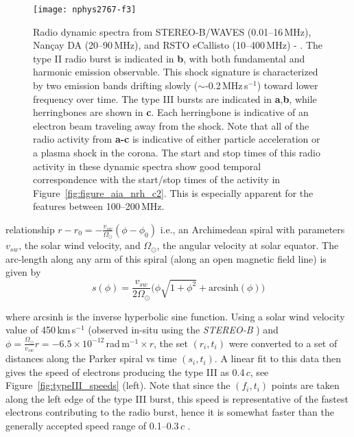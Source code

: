 \begin{sidewaysfigure}[!t]
    \centering
		\texttt{[image: nphys2767-f3]}
\caption[Radio dynamic spectra of 22-September-2011 event]{Radio dynamic spectra from STEREO-B/WAVES (0.01--16\,MHz), Nan\c{c}ay DA (20--90\,MHz), and RSTO eCallisto (10--400\,MHz) - \citep{carley2013}. The type II radio burst is indicated in {\bf b}, with both fundamental and harmonic emission observable. This shock signature is characterized by two emission bands drifting slowly ($\sim$-0.2\,MHz\,s$^{-1}$) toward lower frequency over time. The type III bursts are indicated in {\bf a},{\bf b}, while herringbones are shown in {\bf c}. Each herringbone is indicative of an electron beam traveling away from the shock. Note that all of the radio activity from {\bf a-c} is indicative of either particle acceleration or a plasma shock in the corona. The start and stop times of this radio activity in these dynamic spectra show good temporal correspondence with the start/stop times of the activity in Figure~\ref{fig:figure_aia_nrh_c2}. This is especially apparent for the features between 100--200\,MHz.}
		\label{fig:dyn_spec}
	\end{sidewaysfigure}
\clearpage
\noindent
relationship $r-r_0= -\frac{v_{sw}}{\Omega_{\odot}}( \phi - \phi_0)$ i.e.,
an Archimedean spiral with parameters $v_{sw}$, the solar wind velocity, and $\Omega_{\odot}$, the angular velocity at solar equator. The arc-length along any arm of this spiral (along an open magnetic field line) is given by
\begin{equation}
s(\phi) = \frac{v_{sw}} {2\Omega_{\odot}}\big(\phi\sqrt{1+\phi^2} + \mathrm{arcsinh}(\phi)  \big)
\end{equation}


where arcsinh is the inverse hyperbolic sine function. Using a solar wind velocity value of 450\,km\,s$^{-1}$ (observed in-situ using the \emph{STEREO-B} \citep[PLASTIC;][]{galvin2008}) and $\phi=\frac{ \Omega_{\odot}}{v_{sw}}r=-6.5\times10^{-12}$\,rad\,m$^{-1}\times r$, the set $(r_i,t_i)$ were converted to a set of distances along the Parker spiral vs time $(s_i, t_i)$. A linear fit to this data then gives the speed of electrons producing the type III as 0.4\,$c$, see Figure~\ref{fig:typeIII_speeds} (left). Note that since the $(f_i, t_i)$ points are taken along the left edge of the type III burst, {\color{black} this speed is representative of the fastest electrons contributing to the radio burst, hence it is somewhat faster than the generally accepted speed range of 0.1--0.3\,$c$ \citep{Saint-Hilaire2013}.} 


